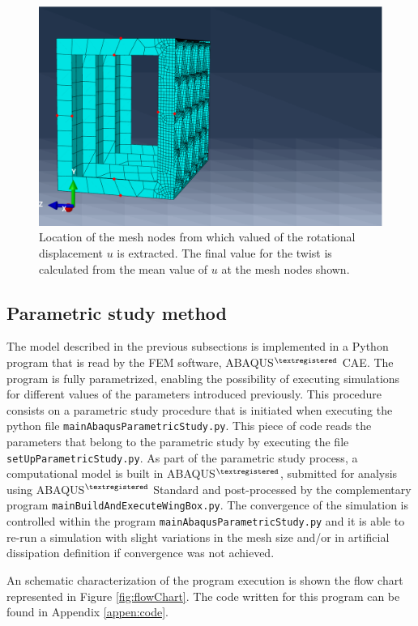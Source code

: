     \begin{figure}[!htpb]
      \centering
      \includegraphics[width=0.5 \textwidth]{figures/model/pointsToEvaluateTwist}
      \caption[Location of the mesh nodes from which valued of the rotational displacement $u$ is extracted]{Location of the mesh nodes from which valued of the rotational displacement $u$ is extracted. The final value for the twist is calculated from the mean value of $u$ at the mesh nodes shown.}
      \label{fig:pointsToEvaluateTwist}
    \end{figure}
  
  \subsection{Parametric study method} \label{subsec:parametricStudy_computationalModel}

    The model described in the previous subsections is implemented in a Python program that is read by the FEM software, ABAQUS$^{\textregistered}$ CAE. The program is fully parametrized, enabling the possibility of executing simulations for different values of the parameters introduced previously. This procedure consists on a parametric study procedure that is initiated when executing the python file \texttt{main\-Abaqus\-Parametric\-Study.py}. This piece of code reads the parameters that belong to the parametric study by executing the file \texttt{set\-Up\-Parametric\-Study.py}. As part of the parametric study process, a computational model is built in ABAQUS$^{\textregistered}$, submitted for analysis using ABAQUS$^{\textregistered}$ Standard and post-processed by the complementary program \texttt{main\-Build\-And\-Execute\-Wing\-Box.py}. The convergence of the simulation is controlled within the program \texttt{main\-Abaqus\-Parametric\-Study.py} and it is able to re-run a simulation with slight variations in the mesh size and/or in artificial dissipation definition if convergence was not achieved. 

    An schematic characterization of the program execution is shown the flow chart represented in Figure \ref{fig:flowChart}. The code written for this program can be found in Appendix \ref{appen:code}. 

